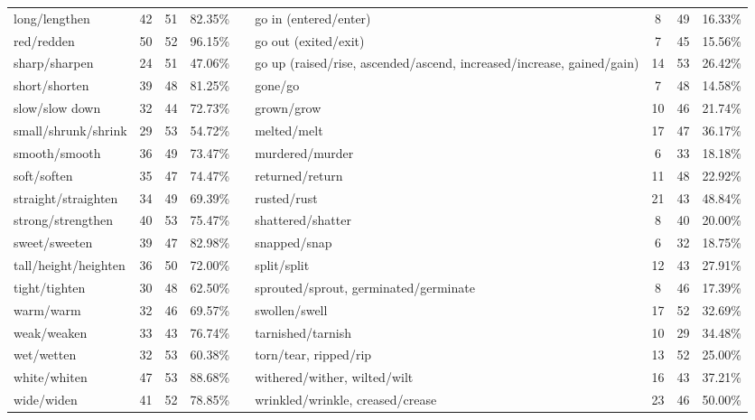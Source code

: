 \begin{tabular}{p{3cm}ccccp{3cm}ccc}
long/lengthen & 42 & 51 & 82.35\% & & go in (entered/enter) & 8 & 49 & 16.33\% \\
red/redden & 50 & 52 & 96.15\% & & go out (exited/exit) & 7 & 45 & 15.56\% \\
sharp/sharpen & 24 & 51 & 47.06\% & & go up (raised/rise, ascended/ascend, increased/increase, gained/gain) & 14 & 53 & 26.42\% \\
short/shorten & 39 & 48 & 81.25\% & & gone/go & 7 & 48 & 14.58\% \\
slow/slow down & 32 & 44 & 72.73\% & & grown/grow & 10 & 46 & 21.74\% \\
small/shrunk/shrink & 29 & 53 & 54.72\% & & melted/melt & 17 & 47 & 36.17\% \\
smooth/smooth & 36 & 49 & 73.47\% & & murdered/murder & 6 & 33 & 18.18\% \\
soft/soften & 35 & 47 & 74.47\% & & returned/return & 11 & 48 & 22.92\% \\
straight/straighten & 34 & 49 & 69.39\% & & rusted/rust & 21 & 43 & 48.84\% \\
strong/strengthen & 40 & 53 & 75.47\% & & shattered/shatter & 8 & 40 & 20.00\% \\
sweet/sweeten & 39 & 47 & 82.98\% & & snapped/snap & 6 & 32 & 18.75\% \\
tall/height/heighten & 36 & 50 & 72.00\% & & split/split & 12 & 43 & 27.91\% \\
tight/tighten & 30 & 48 & 62.50\% & & sprouted/sprout, germinated/germinate & 8 & 46 & 17.39\% \\
warm/warm & 32 & 46 & 69.57\% & & swollen/swell & 17 & 52 & 32.69\% \\
weak/weaken & 33 & 43 & 76.74\% & & tarnished/tarnish & 10 & 29 & 34.48\% \\
wet/wetten & 32 & 53 & 60.38\% & & torn/tear, ripped/rip & 13 & 52 & 25.00\% \\
white/whiten & 47 & 53 & 88.68\% & & withered/wither, wilted/wilt & 16 & 43 & 37.21\% \\
wide/widen & 41 & 52 & 78.85\% & & wrinkled/wrinkle, creased/crease & 23 & 46 & 50.00\%
\end{tabular}